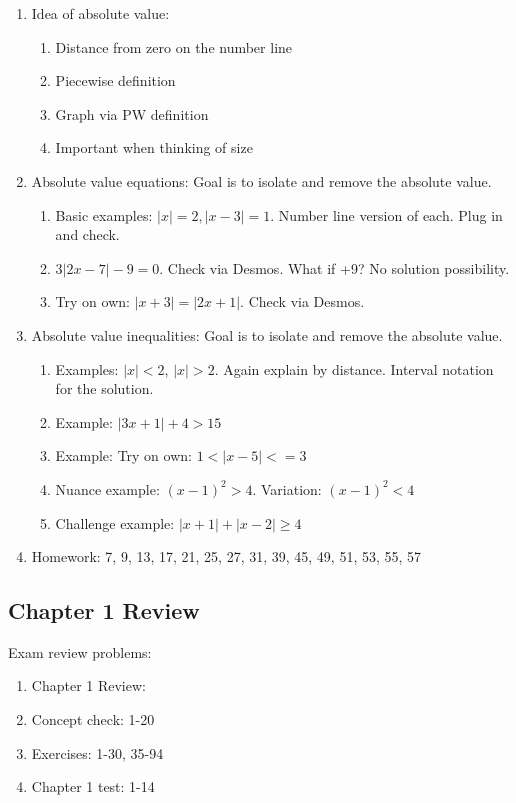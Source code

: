 \documentclass{article}
\begin{document}
\begin{enumerate}
\item Idea of absolute value:
\begin{enumerate}
\item Distance from zero on the number line
\item Piecewise definition
\item Graph via PW definition
\item Important when thinking of size
\end{enumerate}


\item Absolute value equations: Goal is to isolate and remove the absolute value.
\begin{enumerate}
\item Basic examples: $|x|=2, |x-3|=1$. Number line version of each. Plug in and check.
\item $3|2x-7|-9=0$. Check via Desmos. What if +9? No solution possibility.
\item Try on own: $|x+3|=|2x+1|$. Check via Desmos.

\end{enumerate}

\item Absolute value inequalities: Goal is to isolate and remove the absolute value.
\begin{enumerate}
\item Examples: $|x|<2$, $|x|>2$. Again explain by distance. Interval notation for the solution.
\item Example: $|3x+1|+4>15$
\item Example: Try on own: $1<|x-5|<=3$
\item Nuance example: $(x-1)^2 >4$. Variation: $(x-1)^2<4$
\item Challenge example: $|x+1| + |x-2| \geq 4$
\end{enumerate}

\item Homework: 7, 9, 13, 17, 21, 25, 27, 31, 39, 45, 49, 51, 53, 55, 57
\end{enumerate}

\subsection{Chapter 1 Review}

Exam review problems:
\begin{enumerate}
\item Chapter 1 Review: 
\item Concept check: 1-20
\item Exercises: 1-30, 35-94
\item Chapter 1 test: 1-14
\end{enumerate} 
\end{document}
